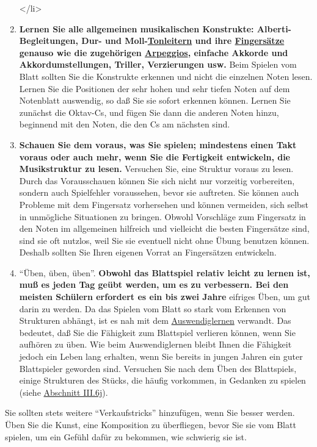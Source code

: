 \begin{enumerate}[label={\arabic*.}]
</li>
\item \textbf{Lernen Sie alle allgemeinen musikalischen Konstrukte: Alberti-Begleitungen, Dur- und Moll-\hyperlink{c1iii5}{Tonleitern} und ihre \hyperlink{table}{Fingersätze} genauso wie die zugehörigen \hyperlink{Arpeggios}{Arpeggios}, einfache Akkorde und Akkordumstellungen, Triller, Verzierungen usw.}
Beim Spielen vom Blatt sollten Sie die Konstrukte erkennen und nicht die einzelnen Noten lesen.
Lernen Sie die Positionen der sehr hohen und sehr tiefen Noten auf dem Notenblatt auswendig, so daß Sie sie sofort erkennen können.
Lernen Sie zunächst die Oktav-Cs, und fügen Sie dann die anderen Noten hinzu, beginnend mit den Noten, die den Cs am nächsten sind.


\item \textbf{Schauen Sie dem voraus, was Sie spielen; mindestens einen Takt voraus oder auch mehr, wenn Sie die Fertigkeit entwickeln, die Musikstruktur zu lesen.}
Versuchen Sie, eine Struktur voraus zu lesen.
Durch das Vorausschauen können Sie sich nicht nur vorzeitig vorbereiten, sondern auch Spielfehler voraussehen, bevor sie auftreten.
Sie können auch Probleme mit dem Fingersatz vorhersehen und können vermeiden, sich selbst in unmögliche Situationen zu bringen.
Obwohl Vorschläge zum Fingersatz in den Noten im allgemeinen hilfreich und vielleicht die besten Fingersätze sind, sind sie oft nutzlos, weil Sie sie eventuell nicht ohne Übung benutzen können.
Deshalb sollten Sie Ihren eigenen Vorrat an Fingersätzen entwickeln.


\item \enquote{Üben, üben, üben}.
\textbf{Obwohl das Blattspiel relativ leicht zu lernen ist, muß es jeden Tag geübt werden, um es zu verbessern.
Bei den meisten Schülern erfordert es ein bis zwei Jahre} eifriges Üben, um gut darin zu werden.
Da das Spielen vom Blatt so stark vom Erkennen von Strukturen abhängt, ist es nah mit dem \hyperlink{c1iii6}{Auswendiglernen} verwandt.
Das bedeutet, daß Sie die Fähigkeit zum Blattspiel verlieren können, wenn Sie aufhören zu üben.
Wie beim Auswendiglernen bleibt Ihnen die Fähigkeit jedoch ein Leben lang erhalten, wenn Sie bereits in jungen Jahren ein guter Blattspieler geworden sind.
Versuchen Sie nach dem Üben des Blattspiels, einige Strukturen des Stücks, die häufig vorkommen, in Gedanken zu spielen (siehe \hyperlink{c1iii6j}{Abschnitt III.6j}).


 \end{enumerate}
Sie sollten stets weitere \enquote{Verkaufstricks} hinzufügen, wenn Sie besser werden.
Üben Sie die Kunst, eine Komposition zu überfliegen, bevor Sie sie vom Blatt spielen, um ein Gefühl dafür zu bekommen, wie schwierig sie ist.
